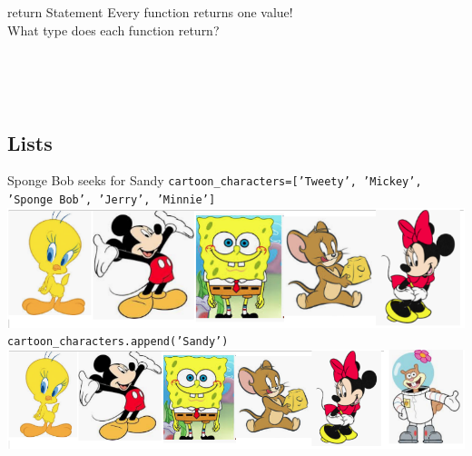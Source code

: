         \begin{frame}{return Statement}
            Every function returns one value!\\
            \pause
            What type does each function return?
            \begin{columns}
                \begin{column}{0.35\textwidth}
                    \pause
                    \inputminted[frame=single, framesep=2pt]{python3}{code-examples/return_int.py}
                \end{column}
                \begin{column}{0.6\textwidth}
                    \pause
                    \inputminted[frame=single, framesep=2pt]{python3}{code-examples/return_string.py}
                \end{column}
            \end{columns}  
        \pause
            \inputminted[frame=single, framesep=2pt]{python3}{code-examples/return_none.py}
            \pause
            \inputminted[frame=single, framesep=2pt]{python3}{code-examples/return_list.py}
        \end{frame}

    \subsection{Lists}
    \begin{frame}{Sponge Bob seeks for Sandy}
        \pause
        \texttt{cartoon\_characters=['Tweety', 'Mickey', 'Sponge Bob', 'Jerry', 'Minnie']}\\
        \includegraphics[width=.80\textwidth]{images/list_cartoons/list0.png}   
        \pause
        \texttt{cartoon\_characters.append('Sandy')}\\
        \pause
        \includegraphics[width=.95\textwidth]{images/list_cartoons/list_after_append.png}       
    \end{frame}

